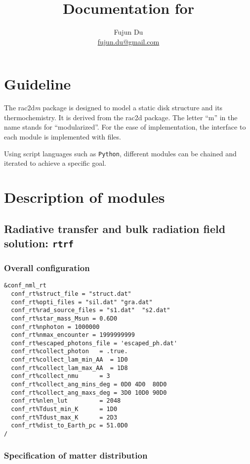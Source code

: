 \documentclass{article}
\title{Documentation for \ractdm}
\author{Fujun Du\\
\url{fujun.du@gmail.com}}
\newcommand{\python}{\texttt{Python}}
\newcommand{\ractdm}{\textsf{rac2d}\textit{m}}
\newcommand{\ractd}{\textsf{rac2d}}
\newcommand{\radtran}{\texttt{rtrf}}
\begin{document}
\maketitle
\tableofcontents

\section{Guideline}

The \ractdm{} package is designed to model a static disk structure and its thermochemistry.  It is derived from the \ractd{} package.  The letter ``m'' in the name stands for ``modularized''.  For the ease of implementation, the interface to each module is implemented with files.

Using script languages such as \python, different modules can be chained and iterated to achieve a specific goal.

\section{Description of modules}

\subsection{Radiative transfer and bulk radiation field solution: \radtran}

\subsubsection{Overall configuration}

\begin{lstlisting}
&conf_nml_rt
  conf_rt%struct_file = "struct.dat"
  conf_rt%opti_files = "sil.dat" "gra.dat"
  conf_rt%rad_source_files = "s1.dat"  "s2.dat"
  conf_rt%star_mass_Msun = 0.6D0
  conf_rt%nphoton = 1000000
  conf_rt%nmax_encounter = 1999999999
  conf_rt%escaped_photons_file = 'escaped_ph.dat'
  conf_rt%collect_photon   = .true.
  conf_rt%collect_lam_min_AA  = 1D0
  conf_rt%collect_lam_max_AA  = 1D8
  conf_rt%collect_nmu      = 3
  conf_rt%collect_ang_mins_deg = 0D0 4D0  80D0
  conf_rt%collect_ang_maxs_deg = 3D0 10D0 90D0
  conf_rt%nlen_lut         = 2048
  conf_rt%Tdust_min_K      = 1D0
  conf_rt%Tdust_max_K      = 2D3
  conf_rt%dist_to_Earth_pc = 51.0D0
/
\end{lstlisting}

\subsubsection{Specification of matter distribution}
\end{document}
